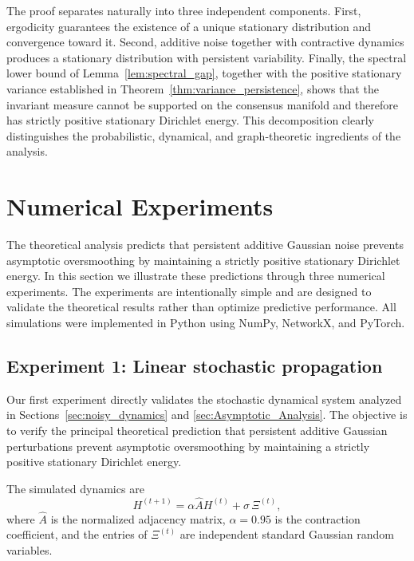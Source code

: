 \documentclass{article}
\begin{document}
The proof separates naturally into three independent components.
	First, ergodicity guarantees the existence of a unique stationary
	distribution and convergence toward it.
	Second, additive noise together with contractive dynamics produces a
	stationary distribution with persistent variability.
	Finally, the spectral lower bound of
	Lemma~\ref{lem:spectral_gap}, together with the positive stationary
	variance established in
	Theorem~\ref{thm:variance_persistence},
	shows that the invariant measure cannot be supported on the consensus
	manifold and therefore has strictly positive stationary Dirichlet
	energy.	
	This decomposition clearly distinguishes the probabilistic,
	dynamical, and graph-theoretic ingredients of the analysis.
	


\section{Numerical Experiments}
\label{sec:Numerical_Experiments}

The theoretical analysis predicts that persistent additive Gaussian noise
prevents asymptotic oversmoothing by maintaining a strictly positive
stationary Dirichlet energy.
In this section we illustrate these predictions through three numerical
experiments.
The experiments are intentionally simple and are designed to validate the
theoretical results rather than optimize predictive performance.
All simulations were implemented in Python using NumPy, NetworkX, and
PyTorch.


\subsection{Experiment 1: Linear stochastic propagation}

Our first experiment directly validates the stochastic dynamical system
analyzed in Sections~\ref{sec:noisy_dynamics} and
\ref{sec:Asymptotic_Analysis}. The objective is to verify the principal
theoretical prediction that persistent additive Gaussian perturbations
prevent asymptotic oversmoothing by maintaining a strictly positive
stationary Dirichlet energy.

The simulated dynamics are
\[
H^{(t+1)}
=
\alpha \hat A H^{(t)}
+
\sigma\,\Xi^{(t)},
\]
where $\hat A$ is the normalized adjacency matrix,
$\alpha=0.95$ is the contraction coefficient,
and the entries of $\Xi^{(t)}$ are independent standard Gaussian random
variables.
\end{document}
